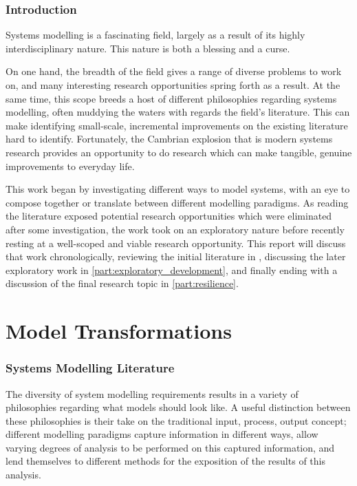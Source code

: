 \documentclass{article}
\begin{document}
\maketitle


\section{Introduction}
\label{sec:introduction}
Systems modelling is a fascinating field, largely as a result of its highly
interdisciplinary nature. This nature is both a blessing and a curse.\par

On one hand, the breadth of the field gives a range of diverse problems to work
on, and many interesting research opportunities spring forth as a result. At the
same time, this scope breeds a host of different philosophies regarding systems
modelling, often muddying the waters with regards the field's literature. This
can make identifying small-scale, incremental improvements on the existing
literature hard to identify. Fortunately, the Cambrian explosion that is modern
systems research provides an opportunity to do research which can make tangible,
genuine improvements to everyday life.\par

This work began by investigating different ways to model systems, with an eye to
compose together or translate between different modelling paradigms. As reading
the literature exposed potential research opportunities which were eliminated
after some investigation, the work took on an exploratory nature before recently
resting at a well-scoped and viable research opportunity. This report will
discuss that work chronologically, reviewing the initial literature in
\cref{part:model_transformations}, discussing the later exploratory work in
\cref{part:exploratory_development}, and finally ending with a discussion of the
final research topic in \cref{part:resilience}.


\part{Model Transformations}
\label{part:model_transformations}
\section{Systems Modelling Literature}
\label{sec:literature}
The diversity of system modelling requirements results in a variety of
philosophies regarding what models should look like. A useful distinction
between these philosophies is their take on the traditional input, process,
output concept; different modelling paradigms capture information in
different ways, allow varying degrees of analysis to be performed on this
captured information, and lend themselves to different methods for the
exposition of the results of this analysis.\par
\end{document}
